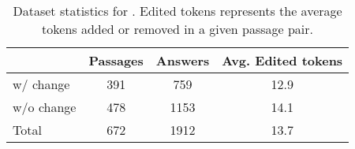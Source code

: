 \begin{table}[htb!]
\begin{center}
\small
\begin{tabular}{lccc}
\hline

& Passages & Answers & Avg. Edited tokens \\
\hline
w/ change & 391 & 759 & 12.9 \\ 
w/o change & 478 & 1153 & 14.1 \\
Total & 672 & 1912 & 13.7  \\ 
\hline
\end{tabular}

\caption{Dataset statistics for \dataset{}. Edited tokens represents the average tokens added or removed in a given passage pair.}
\label{tab:data}

\end{center}
\end{table}